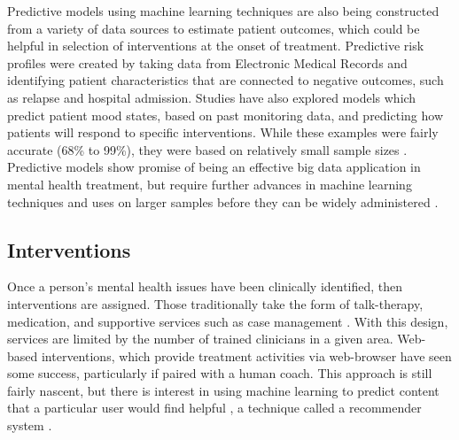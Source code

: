 \documentclass[sigconf]{acmart}
\begin{document}
Predictive models using machine learning techniques are also being constructed from a variety of data sources to estimate patient outcomes, which could be helpful in selection of interventions at the onset of treatment. \cite{bigdatabipolar} Predictive risk profiles were created by taking data from Electronic Medical Records and identifying patient characteristics that are connected to negative outcomes, such as relapse and hospital admission. Studies have also explored models which predict patient mood states, based on past monitoring data, and predicting how patients will respond to specific interventions. While these examples were fairly accurate (68\% to 99\%), they were based on relatively small sample sizes \cite{machinelearnbipolar}.  Predictive models show promise of being an effective big data application in mental health treatment, but require further advances in machine learning techniques and uses on larger samples before they can be widely administered \cite{bigdatabipolar}.
\subsection{Interventions}
Once a person's mental health issues have been clinically identified, then interventions are assigned. Those traditionally take the form of talk-therapy, medication, and supportive services such as case management \cite{samhsatx}. With this design, services are limited by the number of trained clinicians in a given area. Web-based interventions, which provide treatment activities via web-browser have seen some success, particularly if paired with a human coach. This approach is still fairly nascent, but there is interest in using machine learning to predict content that a particular user would find helpful \cite{bitreview}, a technique called a recommender system \cite{recomdef}.
\end{document}
